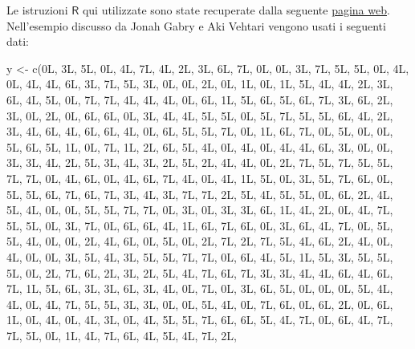 \documentclass[
]{memoir}
\newenvironment{Shaded}{\begin{snugshade}}{\end{snugshade}}
\newcommand{\FunctionTok}[1]{\textcolor[rgb]{0.00,0.00,0.00}{#1}}
\newcommand{\NormalTok}[1]{#1}
\newcommand{\OtherTok}[1]{\textcolor[rgb]{0.56,0.35,0.01}{#1}}
\newcommand{\R}{\textsf{R}} %
\theoremstyle{definition}
\theoremstyle{definition}
\theoremstyle{definition}
\theoremstyle{definition}
\theoremstyle{remark}
\begin{document}
Le istruzioni \(\R\) qui utilizzate sono state recuperate dalla seguente \href{http://avehtari.github.io/BDA_R_demos/demos_rstan/ppc/poisson-ppc.html\#}{pagina web}. Nell'esempio discusso da Jonah Gabry e Aki Vehtari vengono usati i seguenti dati:

\begin{Shaded}
\begin{Highlighting}[]
\NormalTok{y }\OtherTok{\textless{}{-}} \FunctionTok{c}\NormalTok{(0L, 3L, 5L, 0L, 4L, 7L, 4L, 2L, 3L, }
\NormalTok{       6L, 7L, 0L, 0L, 3L, 7L, 5L, 5L, 0L, }
\NormalTok{       4L, 0L, 4L, 4L, 6L, 3L, 7L, 5L, 3L, }
\NormalTok{       0L, 0L, 2L, 0L, 1L, 0L, 1L, 5L, 4L, }
\NormalTok{       4L, 2L, 3L, 6L, 4L, 5L, 0L, 7L, 7L, }
\NormalTok{       4L, 4L, 4L, 0L, 6L, 1L, 5L, 6L, 5L, }
\NormalTok{       6L, 7L, 3L, 6L, 2L, 3L, 0L, 2L, 0L, }
\NormalTok{       6L, 6L, 0L, 3L, 4L, 4L, 5L, 5L, 0L, }
\NormalTok{       5L, 7L, 5L, 5L, 6L, 4L, 2L, 3L, 4L, }
\NormalTok{       6L, 4L, 6L, 6L, 4L, 0L, 6L, 5L, 5L, }
\NormalTok{       7L, 0L, 1L, 6L, 7L, 0L, 5L, 0L, 0L, }
\NormalTok{       5L, 6L, 5L, 1L, 0L, 7L, 1L, 2L, 6L, }
\NormalTok{       5L, 4L, 0L, 4L, 0L, 4L, 4L, 6L, 3L, }
\NormalTok{       0L, 0L, 3L, 3L, 4L, 2L, 5L, 3L, 4L, }
\NormalTok{       3L, 2L, 5L, 2L, 4L, 4L, 0L, 2L, 7L, }
\NormalTok{       5L, 7L, 5L, 5L, 7L, 7L, 0L, 4L, 6L, }
\NormalTok{       0L, 4L, 6L, 7L, 4L, 0L, 4L, 1L, 5L, }
\NormalTok{       0L, 3L, 5L, 7L, 6L, 0L, 5L, 5L, 6L, }
\NormalTok{       7L, 6L, 7L, 3L, 4L, 3L, 7L, 7L, 2L, }
\NormalTok{       5L, 4L, 5L, 5L, 0L, 6L, 2L, 4L, 5L, }
\NormalTok{       4L, 0L, 0L, 5L, 5L, 7L, 7L, 0L, 3L, }
\NormalTok{       0L, 3L, 3L, 6L, 1L, 4L, 2L, 0L, 4L, }
\NormalTok{       7L, 5L, 5L, 0L, 3L, 7L, 0L, 6L, 6L, }
\NormalTok{       4L, 1L, 6L, 7L, 6L, 0L, 3L, 6L, 4L, }
\NormalTok{       7L, 0L, 5L, 5L, 4L, 0L, 0L, 2L, 4L, }
\NormalTok{       6L, 0L, 5L, 0L, 2L, 7L, 2L, 7L, 5L, }
\NormalTok{       4L, 6L, 2L, 4L, 0L, 4L, 0L, 0L, 3L, }
\NormalTok{       5L, 4L, 3L, 5L, 5L, 7L, 7L, 0L, 6L, }
\NormalTok{       4L, 5L, 1L, 5L, 3L, 5L, 5L, 5L, 0L, }
\NormalTok{       2L, 7L, 6L, 2L, 3L, 2L, 5L, 4L, 7L, }
\NormalTok{       6L, 7L, 3L, 3L, 4L, 4L, 6L, 4L, 6L, }
\NormalTok{       7L, 1L, 5L, 6L, 3L, 3L, 6L, 3L, 4L, }
\NormalTok{       0L, 7L, 0L, 3L, 6L, 5L, 0L, 0L, 0L, }
\NormalTok{       5L, 4L, 4L, 0L, 4L, 7L, 5L, 5L, 3L, }
\NormalTok{       3L, 0L, 0L, 5L, 4L, 0L, 7L, 6L, 0L, }
\NormalTok{       6L, 2L, 0L, 6L, 1L, 0L, 4L, 0L, 4L, }
\NormalTok{       3L, 0L, 4L, 5L, 5L, 7L, 6L, 6L, 5L, }
\NormalTok{       4L, 7L, 0L, 6L, 4L, 7L, 7L, 5L, 0L, }
\NormalTok{       1L, 4L, 7L, 6L, 4L, 5L, 4L, 7L, 2L, }

\end{Highlighting}
\end{Shaded}
\end{document}
